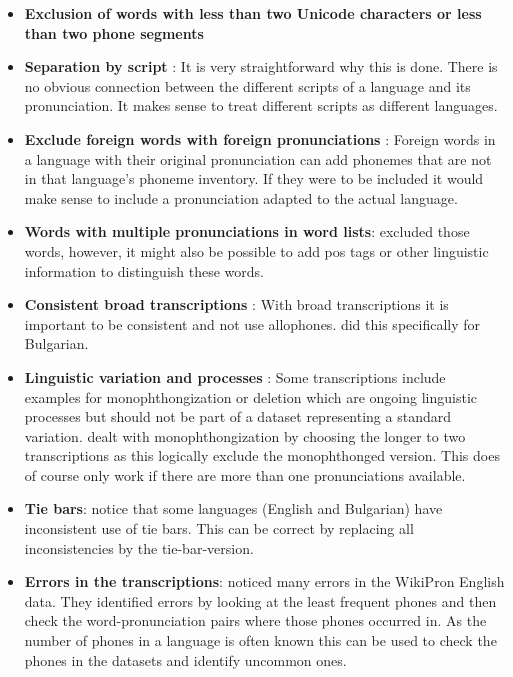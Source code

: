 \begin{itemize}
\item \textbf{Exclusion of words with less than two Unicode characters or less than two phone segments} \citep{Ashby&Bartley.2021} 
\item \textbf{Separation by script} \citep{Ashby&Bartley.2021}: It is very straightforward why this is done. There is no obvious connection between the different scripts of a language and its pronunciation. It makes sense to treat different scripts as different languages. 
\item \textbf{Exclude foreign words with foreign pronunciations} \citep{Ashby&Bartley.2021}: Foreign words in a language with their original pronunciation can add phonemes that are not in that language's phoneme inventory. If they were to be included it would make sense to include a pronunciation adapted to the actual language.
\item \textbf{Words with multiple pronunciations in word lists}: \cite{Ashby&Bartley.2021} excluded those words, however, it might also be possible to add \ac{pos} tags or other linguistic information to distinguish these words.
\item \textbf{Consistent broad transcriptions} \citep{Ashby&Bartley.2021}: With broad transcriptions it is important to be consistent and not use allophones. \cite{Ashby&Bartley.2021} did this specifically for Bulgarian.
\item \textbf{Linguistic variation and processes} \citep{Ashby&Bartley.2021}: Some transcriptions include examples for monophthongization or deletion which are ongoing linguistic processes but should not be part of a dataset representing a standard variation. \cite{Ashby&Bartley.2021} dealt with monophthongization by choosing the longer to two transcriptions as this logically exclude the monophthonged version. This does of course only work if there are more than one pronunciations available. 
\item \textbf{Tie bars}: \cite{Ashby&Bartley.2021} notice that some languages (English and Bulgarian) have inconsistent use of tie bars. This can be correct by replacing all inconsistencies by the tie-bar-version.
\item \textbf{Errors in the transcriptions}: \citet{gautam.2021} noticed many errors in the WikiPron English data. They identified errors by looking at the least frequent phones and then check the word-pronunciation pairs where those phones occurred in. As the number of phones in a language is often known this can be used to check the phones in the datasets and identify uncommon ones. 
\end{itemize}

